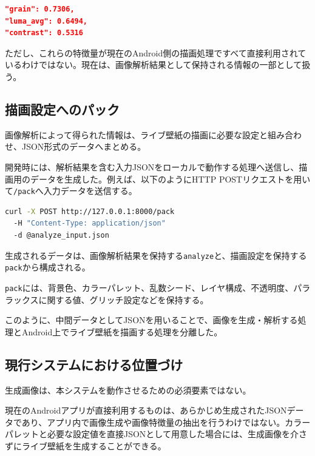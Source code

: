 \noindent\begin{minipage}{\linewidth}
\begin{lstlisting}[language=JSON,caption={解析結果に保持する特徴量の例},label={lst:analysis-features}]
"grain": 0.7306,
"luma_avg": 0.6494,
"contrast": 0.5316
\end{lstlisting}
\end{minipage}\par

ただし、これらの特徴量が現在のAndroid側の描画処理ですべて直接利用されているわけではない。現在は、画像解析結果として保持される情報の一部として扱う。


\subsection{描画設定へのパック}

画像解析によって得られた情報は、ライブ壁紙の描画に必要な設定と組み合わせ、JSON形式のデータへまとめる。

開発時には、解析結果を含む入力JSONをローカルで動作する処理へ送信し、描画用のデータを生成した。例えば、以下のようにHTTP POSTリクエストを用いて\texttt{/pack}へ入力データを送信する。

\noindent\begin{minipage}{\linewidth}
\begin{lstlisting}[language=bash,caption={パック処理への入力例},label={lst:pack-input}]
curl -X POST http://127.0.0.1:8000/pack 
  -H "Content-Type: application/json" 
  -d @analyze_input.json
\end{lstlisting}
\end{minipage}\par

生成されるデータは、画像解析結果を保持する\texttt{analyze}と、描画設定を保持する\texttt{pack}から構成される。

\texttt{pack}には、背景色、カラーパレット、乱数シード、レイヤ構成、不透明度、パララックスに関する値、グリッチ設定などを保持する。

このように、中間データとしてJSONを用いることで、画像を生成・解析する処理とAndroid上でライブ壁紙を描画する処理を分離した。


\subsection{現行システムにおける位置づけ}

生成画像は、本システムを動作させるための必須要素ではない。

現在のAndroidアプリが直接利用するものは、あらかじめ生成されたJSONデータであり、アプリ内で画像生成や画像特徴量の抽出を行うわけではない。カラーパレットと必要な設定値を直接JSONとして用意した場合には、生成画像を介さずにライブ壁紙を生成することができる。

